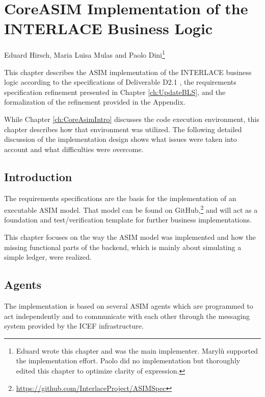 \chapter{CoreASIM Implementation of the INTERLACE Business Logic}
\label{ch:CoreAsimImplementation}

\vspace{-1cm}
\begin{center}
Eduard Hirsch, Maria Luisa Mulas and Paolo Dini\footnote{Eduard wrote this chapter and was the main implementer. Maryl\`u supported the implementation effort. Paolo did no implementation but thoroughly edited this chapter to optimize clarity of expression.}
\end{center}

This chapter describes the ASIM implementation of the INTERLACE business logic according to the specifications of Deliverable D2.1 \cite{INTERLACE_D21}, the requirements specification refinement presented in Chapter \ref{ch:UpdateBLS}, and the formalization of the refinement provided in the Appendix.

While Chapter \ref{ch:CoreAsimIntro} discusses the code execution environment, this chapter describes how that environment was utilized. The following detailed discussion of the implementation design shows what issues were taken into account and what difficulties were overcome.


\section{Introduction}
\label{sec:impl_intro}

The requirements specifications are the basis for the implementation of an executable ASIM model. That model can be found on GitHub,\footnote{\url{https://github.com/InterlaceProject/ASIMSpec}} and will act as a foundation and test/verification template for further business implementations.

This chapter focuses on the way the ASIM model was implemented and how the missing functional parts of the backend, which is mainly about simulating a simple ledger, were realized.

\section{Agents}
\label{sec:impl-agents}

The implementation is based on several ASIM agents which are programmed to act independently and to communicate with each other through the messaging system provided by the ICEF infrastructure.

